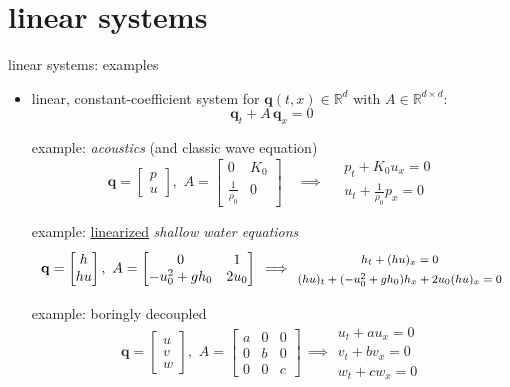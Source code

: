 \documentclass[10pt,hyperref,dvipsnames]{beamer}
\newcommand{\bq}{\mathbf{q}}
\newcommand{\RR}{\mathbb{R}}
\begin{document}
\section{linear systems}

\begin{frame}{linear systems: examples}

\begin{itemize}
\item linear, constant-coefficient system for $\bq(t,x) \in \RR^d$ with $A\in\RR^{d\times d}$:
  $$\bq_t + A\, \bq_x=0$$

\setlength{\itemindent}{11mm}
\item[example:] \emph{acoustics} (and classic wave equation)
        $$\bq = \begin{bmatrix} p \\ u \end{bmatrix}, \,\, A = \begin{bmatrix} 0 & K_0 \\ \frac{1}{\rho_0} & 0 \end{bmatrix} \quad \implies \quad \begin{matrix} p_t + K_0 u_x = 0 \\ u_t + \frac{1}{\rho_0} p_x = 0 \end{matrix}$$
\item[example:] \underline{linearized} \emph{shallow water equations}
        $$\bq = \begin{bmatrix} h \\ h u \end{bmatrix}, \,\, A = \begin{bmatrix} 0 & 1 \\ -u_0^2+gh_0 & 2 u_0 \end{bmatrix} \, \implies \, {\footnotesize \begin{matrix} {\large \strut} h_t + (hu)_x = 0 \\ {\large \strut} (h u)_t + (-u_0^2+gh_0) h_x + 2u_0 (h u)_x = 0 \end{matrix} }$$
\item[example:] boringly decoupled
        $$\bq = \begin{bmatrix} u \\ v \\ w \end{bmatrix}, \,\, A = \begin{bmatrix} a & 0 & 0 \\ 0 & b & 0 \\ 0 & 0 & c \end{bmatrix} \, \implies \begin{matrix} u_t + a u_x = 0 \\ v_t + b v_x = 0 \\ w_t + c w_x = 0 \end{matrix}$$
\end{itemize}
\end{frame}
\end{document}
